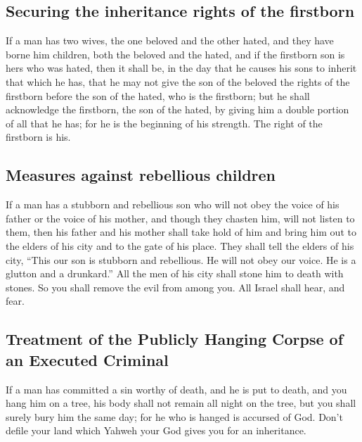 \hypertarget{securing-the-inheritance-rights-of-the-firstborn}{%
\subsection{Securing the inheritance rights of the
firstborn}\label{securing-the-inheritance-rights-of-the-firstborn}}

 If a man has two wives, the one beloved and the other
hated, and they have borne him children, both the beloved and the hated,
and if the firstborn son is hers who was hated,  then it
shall be, in the day that he causes his sons to inherit that which he
has, that he may not give the son of the beloved the rights of the
firstborn before the son of the hated, who is the firstborn;
 but he shall acknowledge the firstborn, the son of the
hated, by giving him a double portion of all that he has; for he is the
beginning of his strength. The right of the firstborn is his.

\hypertarget{measures-against-rebellious-children}{%
\subsection{Measures against rebellious
children}\label{measures-against-rebellious-children}}

 If a man has a stubborn and rebellious son who will not
obey the voice of his father or the voice of his mother, and though they
chasten him, will not listen to them,  then his father
and his mother shall take hold of him and bring him out to the elders of
his city and to the gate of his place.  They shall tell
the elders of his city, ``This our son is stubborn and rebellious. He
will not obey our voice. He is a glutton and a drunkard.''
 All the men of his city shall stone him to death with
stones. So you shall remove the evil from among you. All Israel shall
hear, and fear.

\hypertarget{treatment-of-the-publicly-hanging-corpse-of-an-executed-criminal}{%
\subsection{Treatment of the Publicly Hanging Corpse of an Executed
Criminal}\label{treatment-of-the-publicly-hanging-corpse-of-an-executed-criminal}}

 If a man has committed a sin worthy of death, and he is
put to death, and you hang him on a tree,  his body shall
not remain all night on the tree, but you shall surely bury him the same
day; for he who is hanged is accursed of God. Don't defile your land
which Yahweh your God gives you for an inheritance.

